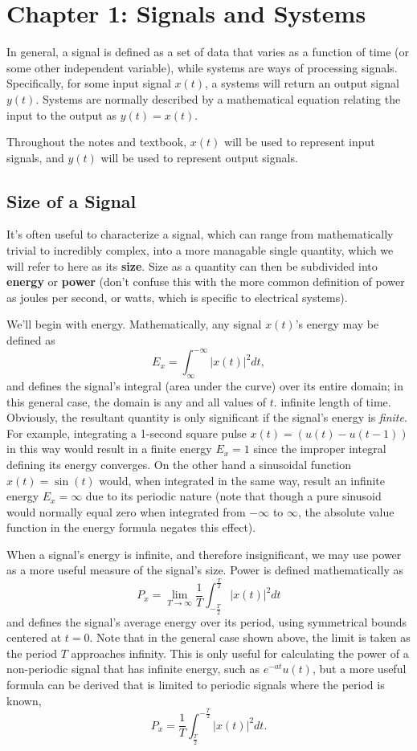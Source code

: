 \documentclass{article}
\begin{document}
\section{Chapter 1: Signals and Systems} 
In general, a signal is defined as a set of data that varies as a function of time (or some other independent variable), while systems are ways of processing signals. Specifically, for some input signal \(x(t)\), a systems will return an output signal \(y(t)\).  Systems are normally described by a mathematical equation relating the input to the output as \(y(t) = x(t)\). 

Throughout the notes and textbook, \(x(t)\) will be used to represent input signals, and \(y(t)\) will be used to represent output signals.

\subsection{Size of a Signal}
It's often useful to characterize a signal, which can range from mathematically trivial to incredibly complex, into a more managable single quantity, which we will refer to here as its \textbf{size}. Size as a quantity can then be subdivided into \textbf{energy} or \textbf{power} (don't confuse this with the more common definition of power as joules per second, or watts, which is specific to electrical systems). 

We'll begin with energy. Mathematically, any signal \(x(t)\)'s energy may be defined as \[
  E_x = \int_{\infty}^{-\infty}|x(t)|^2dt,
\]
and defines the signal's integral (area under the curve) over its entire domain; in this general case, the domain is any and all values of \(t\). infinite length of time. Obviously, the resultant quantity is only significant if the signal's energy is \textit{finite}. For example, integrating a 1-second square pulse \(x(t) = (u(t) - u(t-1))\) in this way would result in a finite energy \(E_x = 1\) since the improper integral defining its energy converges. On the other hand a sinusoidal function \(x(t) = \sin{(t)}\) would, when integrated in the same way, result an infinite energy \(E_x = \infty\) due to its periodic nature (note that though a pure sinusoid would normally equal zero when integrated from \(-\infty\) to \(\infty\), the absolute value function in the energy formula negates this effect).

When a signal's energy is infinite, and therefore insignificant, we may use power as a more useful measure of the signal's size. Power is defined mathematically as \[
	P_x = \lim_{T \to \infty} \frac{1}{T}\int_{-\frac{T}{2}}^{\frac{T}{2}}|x(t)|^2dt
\]
and defines the signal's average energy over its period, using symmetrical bounds centered at \(t=0\). Note that in the general case shown above, the limit is taken as the period \(T\) approaches infinity. This is only useful for calculating the power of a non-periodic signal that has infinite energy, such as \(e^{-at}u(t)\), but a more useful formula can be derived that is limited to periodic signals where the period is known, 
\[
  P_x = \frac{1}{T}\int_{\frac{T}{2}}^{-\frac{T}{2}}|x(t)|^2dt.
\]
\end{document}
